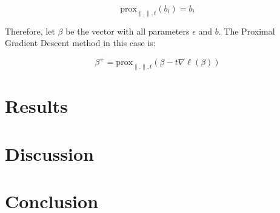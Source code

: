 \documentclass{article}
\begin{document}
\[
\text{prox}_{\|.\|, t}(b_i) = b_i
\]

Therefore, let $\beta$ be the vector with all parameters $\epsilon$ and $b$. The Proximal Gradient Descent method in this case is:

\[
\beta^{+} = \text{prox}_{\|.\|, t}(\beta - t \nabla \ell(\beta))
\]

\section{Results}

\lipsum[4]


\section{Discussion}

\lipsum[5]

\section{Conclusion}

\lipsum[6]


\end{document}
